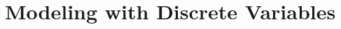 \documentclass[main]{subfiles}
\begin{document}

\section{Modeling with Discrete Variables}
\end{document}
